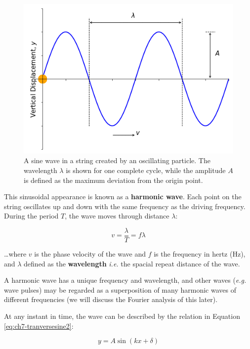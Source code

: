 \documentclass[
]{book}
\begin{document}
\begin{figure}

{\centering \includegraphics[width=0.7\linewidth]{visualisations/ch7-transversesine1} 

}

\caption{A sine wave in a string created by an oscillating particle.  The wavelength $\lambda$ is shown for one complete cycle, while the amplitude $A$ is defined as the maximum deviation from the origin point.}\label{fig:ch7-transversesine1}
\end{figure}

This sinusoidal appearance is known as a \textbf{harmonic wave}. Each point on the string oscillates up and down with the same frequency as the driving frequency. During the period \(T\), the wave moves through distance \(\lambda\):

\begin{equation}
v = \frac{\lambda}{T} = f\lambda
\label{eq:ch7-tranversesine1}
\end{equation}

\ldots where \(v\) is the phase velocity of the wave and \(f\) is the frequency in hertz (Hz), and \(\lambda\) defined as the \textbf{wavelength} \emph{i.e.} the spacial repeat distance of the wave.

A harmonic wave has a unique frequency and wavelength, and other waves (\emph{e.g.} wave pulses) may be regarded as a superposition of many harmonic waves of different frequencies (we will discuss the Fourier analysis of this later).

At any instant in time, the wave can be described by the relation in Equation \eqref{eq:ch7-tranversesine2}:

\begin{equation}
y = A \sin(kx + \delta)
\label{eq:tranversesine2}
\end{equation}
\end{document}
